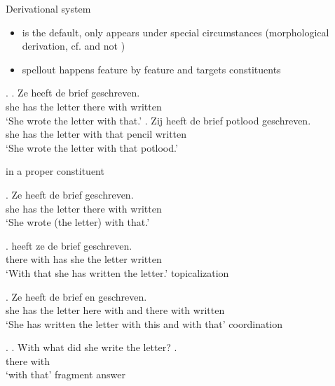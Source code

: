 \documentclass[xcolor=dvipsnames,10pt]{beamer}
\begin{document}
\begin{frame}{Derivational system}

\begin{itemize}
  \item {} is the default,  only appears under special circumstances (morphological derivation, cf.  and not ) \pause
  \item spellout happens feature by feature and targets constituents
\end{itemize}



\pause

\ex.
\ag. Ze heeft de brief   geschreven.\\
 she has the letter there with written\\
 `She wrote the letter with that.'
\bg. Zij heeft de brief   potlood geschreven.\\
 she has the letter with that pencil written\\
 `She wrote the letter with that potlood.'

\end{frame}


\begin{frame}{ in a proper constituent}

\exg. Ze heeft de brief   geschreven.\\
 she has the letter there with written\\
 `She wrote (the letter) with that.'

\pause

\exg.   heeft ze de brief geschreven.\\
 there with has she the letter written\\
 `With that she has written the letter.' \hfill topicalization

\pause

\exg. Ze heeft de brief   en   geschreven.\\
 she has the letter here with and there with written\\
 `She has written the letter with this and with that' \hfill coordination

\pause

\ex.
\a. With what did she write the letter?
\bg.  \\
 there with\\
 `with that' \hfill fragment answer

\end{frame}
\end{document}
